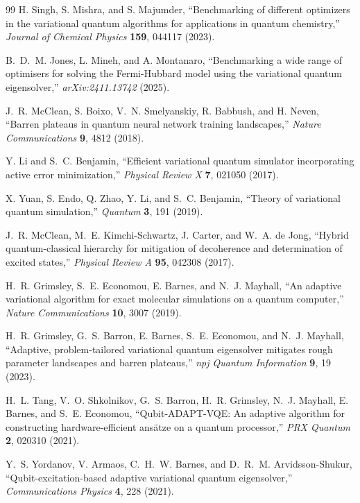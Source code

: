 \documentclass[
  reprint,
  amsmath,
  amssymb,
  aps,
  pra,
  nofootinbib,
  superscriptaddress,
  floatfix
]{revtex4-2}
\begin{document}
\begin{thebibliography}{99}
H. Singh, S. Mishra, and S. Majumder,
``Benchmarking of different optimizers in the variational quantum algorithms for applications in quantum chemistry,''
\emph{Journal of Chemical Physics} \textbf{159}, 044117 (2023).

B.~D.~M. Jones, L. Mineh, and A. Montanaro,
``Benchmarking a wide range of optimisers for solving the Fermi-Hubbard model using the variational quantum eigensolver,''
\emph{arXiv:2411.13742} (2025).

J.~R. McClean, S. Boixo, V.~N. Smelyanskiy, R. Babbush, and H. Neven,
``Barren plateaus in quantum neural network training landscapes,''
\emph{Nature Communications} \textbf{9}, 4812 (2018).

Y. Li and S.~C. Benjamin,
``Efficient variational quantum simulator incorporating active error minimization,''
\emph{Physical Review X} \textbf{7}, 021050 (2017).

X. Yuan, S. Endo, Q. Zhao, Y. Li, and S.~C. Benjamin,
``Theory of variational quantum simulation,''
\emph{Quantum} \textbf{3}, 191 (2019).

J.~R. McClean, M.~E. Kimchi-Schwartz, J. Carter, and W.~A. de Jong,
``Hybrid quantum-classical hierarchy for mitigation of decoherence and determination of excited states,''
\emph{Physical Review A} \textbf{95}, 042308 (2017).

H.~R. Grimsley, S.~E. Economou, E. Barnes, and N.~J. Mayhall,
``An adaptive variational algorithm for exact molecular simulations on a quantum computer,''
\emph{Nature Communications} \textbf{10}, 3007 (2019).

H.~R. Grimsley, G.~S. Barron, E. Barnes, S.~E. Economou, and N.~J. Mayhall,
``Adaptive, problem-tailored variational quantum eigensolver mitigates rough parameter landscapes and barren plateaus,''
\emph{npj Quantum Information} \textbf{9}, 19 (2023).

H.~L. Tang, V.~O. Shkolnikov, G.~S. Barron, H.~R. Grimsley, N.~J. Mayhall, E. Barnes, and S.~E. Economou,
``Qubit-ADAPT-VQE: An adaptive algorithm for constructing hardware-efficient ans\"atze on a quantum processor,''
\emph{PRX Quantum} \textbf{2}, 020310 (2021).

Y.~S. Yordanov, V. Armaos, C.~H.~W. Barnes, and D.~R.~M. Arvidsson-Shukur,
``Qubit-excitation-based adaptive variational quantum eigensolver,''
\emph{Communications Physics} \textbf{4}, 228 (2021).


\end{thebibliography}
\end{document}
